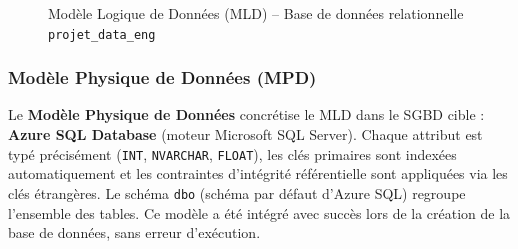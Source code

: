 \documentclass[12pt,a4paper]{article}
\begin{document}
\begin{figure}[H]
{
}
\caption{Modèle Logique de Données (MLD) -- Base de données relationnelle \texttt{projet\_data\_eng}}
\end{figure}
\FloatBarrier
\subsubsection{Modèle Physique de Données (MPD)}

Le \textbf{Modèle Physique de Données} concrétise le MLD dans le SGBD cible : \textbf{Azure SQL Database} (moteur Microsoft SQL Server). Chaque attribut est typé précisément (\texttt{INT}, \texttt{NVARCHAR}, \texttt{FLOAT}), les clés primaires sont indexées automatiquement et les contraintes d'intégrité référentielle sont appliquées via les clés étrangères. Le schéma \texttt{dbo} (schéma par défaut d'Azure SQL) regroupe l'ensemble des tables. Ce modèle a été intégré avec succès lors de la création de la base de données, sans erreur d'exécution.
\end{document}
